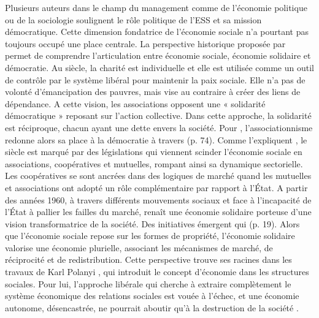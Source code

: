             Plusieurs auteurs dans le champ du management comme de l’économie politique ou de la sociologie soulignent le rôle politique de l’ESS et sa mission démocratique. Cette dimension fondatrice de l’économie sociale n’a pourtant pas toujours occupé une place centrale. La perspective historique  proposée par \textcite{chanial2002leconomie} permet de comprendre l’articulation entre économie sociale, économie solidaire et démocratie. Au  siècle, la charité est individuelle et elle est utilisée comme un outil de contrôle par le système libéral pour maintenir la paix sociale. Elle n’a pas de volonté d’émancipation des pauvres, mais vise au contraire à créer des liens de dépendance. A cette vision, les associations opposent une « solidarité démocratique » reposant sur l’action collective. Dans cette approche, la solidarité est réciproque, chacun ayant une dette envers la société. Pour \textcite{laville2016economie}, l’associationnisme redonne alors sa place à la démocratie à travers  (p. 74). Comme l’expliquent \textcite{chanial2002leconomie}, le  siècle est marqué par des législations qui viennent scinder l’économie sociale en associations, coopératives et mutuelles, rompant ainsi sa dynamique sectorielle. Les coopératives se sont ancrées dans des logiques de marché quand les mutuelles et associations ont adopté un rôle complémentaire par rapport à l’État. A partir des années 1960, à travers différents mouvements sociaux et face à l’incapacité de l’État à pallier les failles du marché, renaît une économie solidaire porteuse d’une vision transformatrice de la société. Des initiatives émergent qui  (p. 19). Alors que l’économie sociale repose sur les formes de propriété, l’économie solidaire valorise une économie plurielle, associant les mécanismes de marché, de réciprocité et de redistribution. Cette perspective trouve ses racines dans les travaux de Karl Polanyi \parencite{servet2007principe, polanyi1944great}, qui introduit le concept d'économie  dans les structures sociales. Pour lui, l'approche libérale qui cherche à extraire complètement le système économique des relations sociales est vouée à l'échec, et une économie autonome, désencastrée, ne pourrait aboutir qu'à la destruction de la société \parencite{block2003karl, valensi1980karl}. \\

